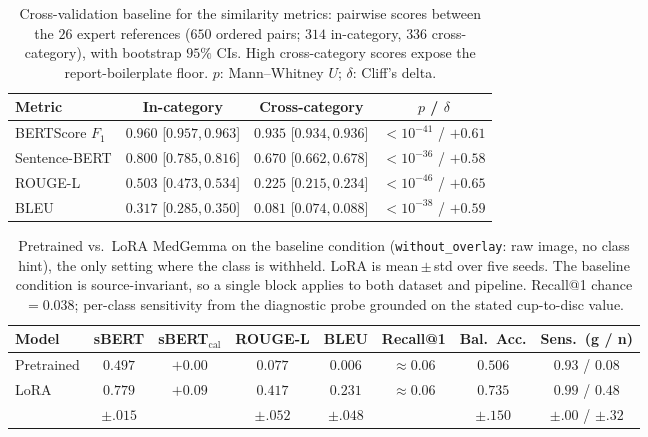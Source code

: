 \documentclass[runningheads]{llncs}
\begin{document}
\begin{table}[t]
\centering
\caption{Cross-validation baseline for the similarity metrics: pairwise scores
between the $26$ expert references ($650$ ordered pairs; $314$ in-category, $336$
cross-category), with bootstrap $95\%$ CIs. High cross-category scores expose the
report-boilerplate floor. $p$: Mann--Whitney $U$; $\delta$: Cliff's delta.}
\label{tab:xcat}
\begin{tabular}{lccc}
\toprule
Metric & In-category & Cross-category & $p$ / $\delta$ \\
\midrule
BERTScore $F_1$ & $0.960$ [$0.957,0.963$] & $0.935$ [$0.934,0.936$] & $<10^{-41}$ / $+0.61$ \\
Sentence-BERT   & $0.800$ [$0.785,0.816$] & $0.670$ [$0.662,0.678$] & $<10^{-36}$ / $+0.58$ \\
ROUGE-L         & $0.503$ [$0.473,0.534$] & $0.225$ [$0.215,0.234$] & $<10^{-46}$ / $+0.65$ \\
BLEU            & $0.317$ [$0.285,0.350$] & $0.081$ [$0.074,0.088$] & $<10^{-38}$ / $+0.59$ \\
\bottomrule
\end{tabular}
\end{table}

\begin{table}[t]
\centering
\caption{Pretrained vs.\ \gls{LoRA} MedGemma on the baseline condition
(\texttt{without\_overlay}: raw image, no class hint), the only setting where the
class is withheld. \gls{LoRA} is mean\,$\pm$\,std over five seeds. The baseline
condition is source-invariant, so a single block applies to both dataset and
pipeline. Recall@1 chance $=0.038$; per-class sensitivity from the diagnostic
probe grounded on the stated cup-to-disc value.}
\label{tab:main}
\setlength{\tabcolsep}{4pt}
\begin{tabular}{lccccccc}
\toprule
Model & sBERT & sBERT$_{\text{cal}}$ & ROUGE-L & BLEU & Recall@1 & Bal.\ Acc. & Sens.\ (g / n) \\
\midrule
Pretrained & $0.497$ & $+0.00$ & $0.077$ & $0.006$ & $\approx0.06$ & $0.506$ & $0.93$ / $0.08$ \\
LoRA & $0.779$ & $+0.09$ & $0.417$ & $0.231$ & $\approx0.06$ & $0.735$ & $0.99$ / $0.48$ \\
       & \scriptsize$\pm.015$ & & \scriptsize$\pm.052$ & \scriptsize$\pm.048$ & & \scriptsize$\pm.150$ & \scriptsize$\pm.00$ / $\pm.32$ \\
\bottomrule
\end{tabular}
\end{table}
\end{document}
